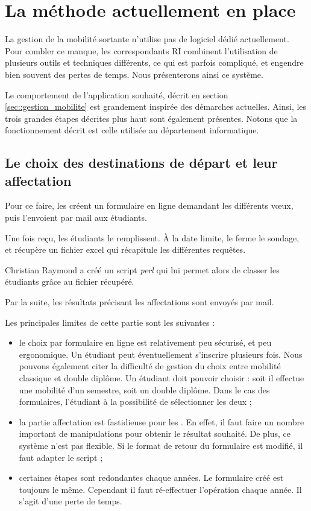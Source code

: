 
		\section{La méthode actuellement en place}
	

La gestion de la mobilité sortante n'utilise pas de logiciel dédié actuellement. Pour combler ce manque, les correspondants RI combinent l'utilisation de plusieurs outils et techniques différents, ce qui est parfois compliqué, et engendre bien souvent des pertes de temps. Nous présenterons ainsi ce système.



Le comportement de l'application souhaité, décrit en section \ref{sec::gestion_mobilite} est grandement inspirée des démarches actuelles. Ainsi, les trois grandes étapes décrites plus haut sont également présentes. Notons que la fonctionnement  décrit est celle utilisée au département informatique.  
 \subsection{Le choix des destinations de départ et leur affectation}
		 
		Pour ce faire, les \ris créent un formulaire en ligne demandant les différents vœux, puis l'envoient par mail aux étudiants. 
		
		Une fois reçu, les étudiants le remplissent. À la date limite, le \ri ferme le sondage, et récupère un fichier excel qui récapitule les différentes requêtes. 
		
		Christian Raymond a créé un script \textit{perl} qui lui permet alors de classer les étudiants grâce au fichier récupéré.
		
		Par la suite, les résultats  précisant les affectations sont envoyés par mail. 
		
		\medbreak
		
		Les principales limites de cette partie sont les suivantes : 
		\begin{itemize}
		\item le choix par formulaire en ligne est relativement peu sécurisé, et peu ergonomique. Un étudiant peut  éventuellement s'inscrire plusieurs fois. Nous pouvons également citer la difficulté de gestion du choix entre mobilité classique et double diplôme. Un étudiant doit pouvoir choisir : soit il effectue une mobilité d'un semestre, soit un double diplôme. Dans le cas des formulaires, l'étudiant à la possibilité de sélectionner les deux ; 
		\item la partie affectation est fastidieuse  pour les \ris. En effet, il faut faire un nombre important de manipulations pour obtenir le résultat  souhaité. De plus, ce système n'est pas flexible. Si le format de retour du formulaire est modifié, il faut adapter le script ;
		\item certaines étapes sont redondantes chaque années. Le formulaire créé est toujours le même. Cependant il faut ré-effectuer l'opération chaque année. Il s'agit d'une perte de temps. 
		\end{itemize}

